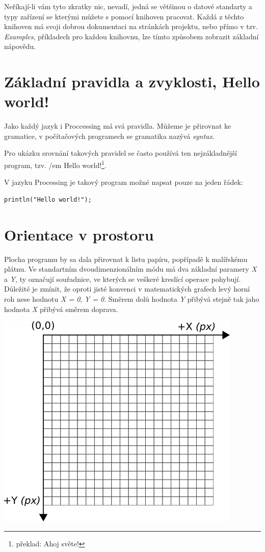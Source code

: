 \documentclass[11pt]{article}
\begin{document}
Neříkají-li vám tyto zkratky nic, nevadí, jedná se většinou o datové standarty a typy zařízení se kterými můžete s pomocí knihoven pracovat. Každá z těchto knihoven má svoji dobrou dokumentaci na stránkách projektu, nebo přímo v tzv. {\em Examples}, příkladech pro každou knihovnu, lze tímto způsobem zobrazit základní nápovědu. 



\newpage
\section{Základní pravidla a zvyklosti, Hello world!}

Jako každý jazyk i Proccessing má svá pravidla. Můžeme je přirovnat ke gramatice, v počítačových programech se gramatika nazývá {\em syntax}.

Pro ukázku srovnání takových pravidel se často používá ten nejzákladnější program, tzv. {/em Hello world!}\footnote{překlad: Ahoj světe!}.

V jazyku Processing je takový program možné napsat pouze na jeden řádek:

\begin{lstlisting}
println("Hello world!");
\end{lstlisting}



\newpage
\section{Orientace v prostoru}

Plocha programu by sa dala přirovnat k listu papíru, popřípadě k malířskému plátnu. Ve standartním dvoudimenzionálním módu má dva základní paramery {\em X} a {\em Y}, ty označují souřadnice, ve kterých se veškeré kreslící operace pohybují. Důležité je zmínit, že oproti jisté konvenci v matematických grafech levý horní roh nese hodnotu {\em X = 0}, {\em Y = 0}. Směrem dolů hodnota {\em Y} přibývá stejně tak jaho hodnota {\em X} přibývá směrem doprava.\\

\begin{center}
\includegraphics[scale = 1]{imgs/grid2d.png}
\end{center}
\end{document}
